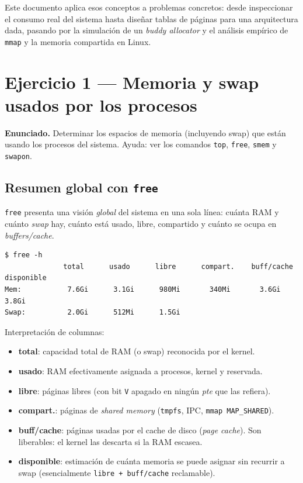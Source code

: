 \documentclass[11pt,a4paper]{article}
\begin{document}
Este documento aplica esos conceptos a problemas concretos: desde
inspeccionar el consumo real del sistema hasta diseñar tablas de
páginas para una arquitectura dada, pasando por la simulación de un
\emph{buddy allocator} y el análisis empírico de \texttt{mmap} y la
memoria compartida en Linux.

\section{Ejercicio 1 --- Memoria y swap usados por los procesos}

\textbf{Enunciado.} Determinar los espacios de memoria (incluyendo
swap) que están usando los procesos del sistema. Ayuda: ver los
comandos \texttt{top}, \texttt{free}, \texttt{smem} y \texttt{swapon}.

\subsection{Resumen global con \texttt{free}}

\texttt{free} presenta una visión \emph{global} del sistema en una
sola línea: cuánta RAM y cuánto \emph{swap} hay, cuánto está usado,
libre, compartido y cuánto se ocupa en \emph{buffers/cache}.

\begin{lstlisting}[style=shellstyle]
$ free -h
              total      usado      libre      compart.    buff/cache  disponible
Mem:           7.6Gi      3.1Gi      980Mi       340Mi       3.6Gi      3.8Gi
Swap:          2.0Gi      512Mi      1.5Gi
\end{lstlisting}

Interpretación de columnas:
\begin{itemize}[leftmargin=*,nosep]
    \item \textbf{total}: capacidad total de RAM (o swap) reconocida
        por el kernel.
    \item \textbf{usado}: RAM efectivamente asignada a procesos,
        kernel y reservada.
    \item \textbf{libre}: páginas libres (con bit \texttt{V} apagado
        en ningún \emph{pte} que las refiera).
    \item \textbf{compart.}: páginas de \emph{shared memory}
        (\texttt{tmpfs}, IPC, \texttt{mmap MAP\_SHARED}).
    \item \textbf{buff/cache}: páginas usadas por el cache de disco
        (\emph{page cache}). Son liberables: el kernel las descarta
        si la RAM escasea.
    \item \textbf{disponible}: estimación de cuánta memoria se puede
        asignar sin recurrir a swap (esencialmente
        \texttt{libre + buff/cache} reclamable).
\end{itemize}
\end{document}
